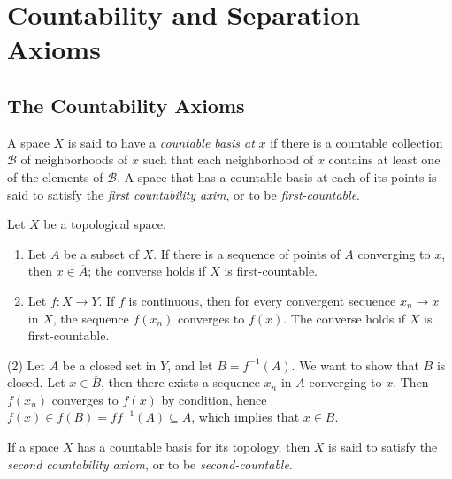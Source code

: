 \section{Countability and Separation Axioms}

\subsection{The Countability Axioms}

\begin{definition}
  A space \( X \) is said to have a \emph{countable basis at} \( x \) if there is a countable collection \( \mathcal{B} \) of neighborhoods of \( x \) such that each neighborhood of \( x \) contains at least one of the elements of \( \mathcal{B} \).
  A space that has a countable basis at each of its points is said to satisfy the \emph{first countability axim}, or to be \emph{first-countable}.
\end{definition}

\begin{theorem}
  Let \( X \) be a topological space.
  \begin{enumerate}
    \item Let \( A \) be a subset of \( X \).
      If there is a sequence of points of \( A \) converging to \( x \), then \( x \in \overline{A} \);
      the converse holds if \( X \) is first-countable.
    \item Let \( f: X \to Y \).
      If \( f \) is continuous, then for every convergent sequence \( x_n \to x \) in \( X \), the sequence \( f(x_n) \) converges to \( f(x) \).
      The converse holds if \( X \) is first-countable.
  \end{enumerate}
\end{theorem}
\begin{sketchproof}
  (2) Let \( A \) be a closed set in \( Y \), and let \( B = f^{-1}(A) \).
  We want to show that \( B \) is closed.
  Let \( x \in \overline{B} \), then there exists a sequence \( x_n \) in \( A \) converging to \( x \).
  Then \( f(x_n) \) converges to \( f(x) \) by condition, hence \( f(x) \in f(B) = ff^{-1}(A) \subseteq A \), which implies that \( x \in B \).
\end{sketchproof}

\begin{definition}
  If a space \( X \) has a countable basis for its topology, then \( X \) is said to satisfy the \emph{second countability axiom}, or to be \emph{second-countable}.
\end{definition}


